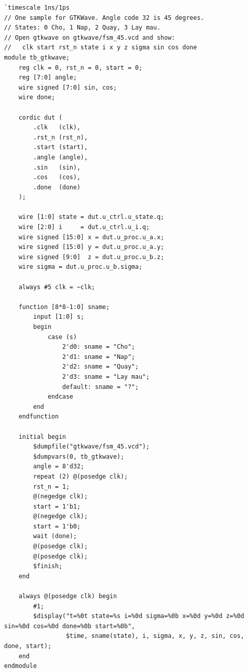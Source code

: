\documentclass[12pt,a4paper]{article}
\begin{document}
\begin{verbatim}
`timescale 1ns/1ps
// One sample for GTKWave. Angle code 32 is 45 degrees.
// States: 0 Cho, 1 Nap, 2 Quay, 3 Lay mau.
// Open gtkwave on gtkwave/fsm_45.vcd and show:
//   clk start rst_n state i x y z sigma sin cos done
module tb_gtkwave;
    reg clk = 0, rst_n = 0, start = 0;
    reg [7:0] angle;
    wire signed [7:0] sin, cos;
    wire done;

    cordic dut (
        .clk   (clk),
        .rst_n (rst_n),
        .start (start),
        .angle (angle),
        .sin   (sin),
        .cos   (cos),
        .done  (done)
    );

    wire [1:0] state = dut.u_ctrl.u_state.q;
    wire [2:0] i     = dut.u_ctrl.u_i.q;
    wire signed [15:0] x = dut.u_proc.u_a.x;
    wire signed [15:0] y = dut.u_proc.u_a.y;
    wire signed [9:0]  z = dut.u_proc.u_b.z;
    wire sigma = dut.u_proc.u_b.sigma;

    always #5 clk = ~clk;

    function [8*8-1:0] sname;
        input [1:0] s;
        begin
            case (s)
                2'd0: sname = "Cho";
                2'd1: sname = "Nap";
                2'd2: sname = "Quay";
                2'd3: sname = "Lay mau";
                default: sname = "?";
            endcase
        end
    endfunction

    initial begin
        $dumpfile("gtkwave/fsm_45.vcd");
        $dumpvars(0, tb_gtkwave);
        angle = 8'd32;
        repeat (2) @(posedge clk);
        rst_n = 1;
        @(negedge clk);
        start = 1'b1;
        @(negedge clk);
        start = 1'b0;
        wait (done);
        @(posedge clk);
        @(posedge clk);
        $finish;
    end

    always @(posedge clk) begin
        #1;
        $display("t=%0t state=%s i=%0d sigma=%0b x=%0d y=%0d z=%0d sin=%0d cos=%0d done=%0b start=%0b",
                 $time, sname(state), i, sigma, x, y, z, sin, cos, done, start);
    end
endmodule
\end{verbatim}
\end{document}
